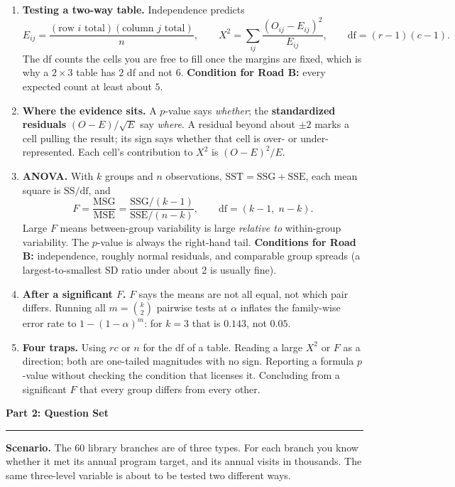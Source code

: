 \documentclass[11pt]{article}
\newcommand{\parttitle}[1]{%
  \par\medskip\noindent
  {\large\bfseries #1}\par
  \vspace{-.5em}\noindent\rule{\linewidth}{0.4pt}\par\smallskip}
\begin{document}
{\begin{enumerate}[label=\textbf{\arabic*.}, wide=0pt, itemsep=.4em, topsep=.5em]
\item \textbf{Testing a two-way table.} Independence predicts
\[
E_{ij} = \frac{(\text{row } i \text{ total})(\text{column } j \text{ total})}{n},
\qquad
X^2 = \sum_{ij} \frac{(O_{ij}-E_{ij})^2}{E_{ij}},
\qquad \text{df} = (r-1)(c-1).
\]
The df counts the cells you are free to fill once the margins are fixed, which is why a
$2\times3$ table has $2$ df and not $6$. \textbf{Condition for Road B:} every expected count at
least about $5$.

\item \textbf{Where the evidence sits.} A $p$-value says \emph{whether}; the
\textbf{standardized residuals} $(O-E)/\sqrt{E}$ say \emph{where}. A residual beyond about
$\pm 2$ marks a cell pulling the result; its sign says whether that cell is over- or
under-represented. Each cell's contribution to $X^2$ is $(O-E)^2/E$.

\item \textbf{ANOVA.} With $k$ groups and $n$ observations,
$\text{SST} = \text{SSG} + \text{SSE}$, each mean square is $\text{SS}/\text{df}$, and
\[
F = \frac{\text{MSG}}{\text{MSE}}
= \frac{\text{SSG}/(k-1)}{\text{SSE}/(n-k)} ,
\qquad \text{df} = (k-1,\; n-k).
\]
Large $F$ means between-group variability is large \emph{relative to} within-group variability.
The $p$-value is always the right-hand tail. \textbf{Conditions for Road B:} independence, roughly
normal residuals, and comparable group spreads (a largest-to-smallest SD ratio under about 2 is
usually fine).

\item \textbf{After a significant $F$.} $F$ says the means are not all equal, not which pair
differs. Running all $m = \binom{k}{2}$ pairwise tests at $\alpha$ inflates the family-wise error
rate to $1-(1-\alpha)^m$: for $k=3$ that is $0.143$, not $0.05$.

\item \textbf{Four traps.} Using $rc$ or $n$ for the df of a table. Reading a large $X^2$ or $F$ as
a direction; both are one-tailed magnitudes with no sign. Reporting a formula $p$-value without
checking the condition that licenses it. Concluding from a significant $F$ that every group differs
from every other.

\end{enumerate}

}

\newpage

\parttitle{Part 2: Question Set}

\noindent\textbf{Scenario.} The $60$ library branches are of three types. For each branch you know
whether it met its annual program target, and its annual visits in thousands. The same
three-level variable is about to be tested two different ways.
\end{document}
